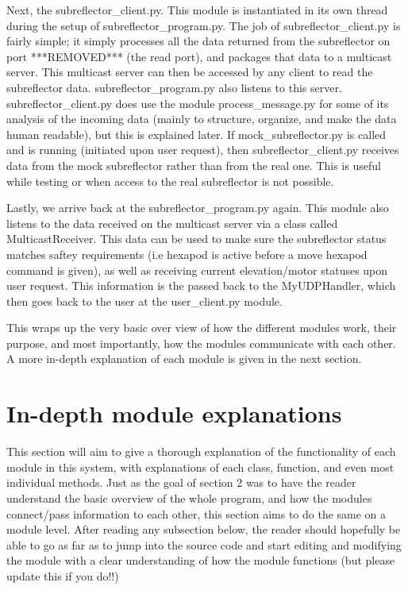 \documentclass{article}
\begin{document}
Next, the subreflector\_client.py. This module is instantiated in its own thread  during the setup of subreflector\_program.py.  The job of subreflector\_client.py is fairly simple; it simply  processes all the data returned from the subreflector on port ***REMOVED*** (the read port), and packages that data to a multicast server. This multicast server can then be accessed by any client to read the subreflector data. subreflector\_program.py also listens to this server. subreflector\_client.py does use the module process\_message.py for some of its analysis of the incoming data (mainly to structure, organize, and make the data human readable), but this is explained later. If mock\_subreflector.py is called and is running (initiated upon user request), then subreflector\_client.py receives data from the mock subreflector rather than from the real one. This is useful while testing or when access to the real subreflector is not possible. 

\vspace{10pt}

Lastly, we arrive back at the subreflector\_program.py again. This module also listens to the data received on the multicast server via a class called MulticastReceiver. This data can be used to make sure the subreflector status matches saftey requirements  (i.e hexapod is active before a move hexapod command is given), as well as receiving current elevation/motor statuses upon user request. This information is the passed back to the MyUDPHandler, which then goes back to the user at the user\_client.py module.

\vspace{10pt}

This wraps up the very basic over view of how the different modules work, their purpose, and most importantly, how the modules communicate with each other. A  more in-depth explanation of each module is given in the next section. 




\newpage
\section{In-depth module explanations}

This section will aim to give a thorough  explanation of the functionality of each module in this system, with explanations of each class, function, and even most individual methods.  Just as the goal of section 2 was to have the reader understand the basic overview of the whole program, and how the modules connect/pass information to each other, this section aims to do the same on a module level. After reading any subsection below, the reader should hopefully be able to go as far as to jump into the source code and start editing and modifying the module with a clear understanding of how the module functions (but please update this if you do!!)
\end{document}

